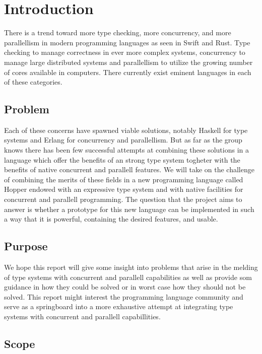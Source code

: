 \chapter{Introduction}

There is a trend toward more type checking, more concurrency, and more parallellism in modern programming languages as seen in Swift\cite{swift} and Rust\cite{rust}. Type checking to manage correctness in ever more complex systems, concurrency to manage large distributed systems and parallellism to utilize the growing number of cores available in computers. There currently exist eminent languages in each of these categories.

\section{Problem}

Each of these concerns have spawned viable solutions, notably Haskell\cite{haskell} for type systems and Erlang\cite{erlang} for concurrency and parallellism. But as far as the group knows there has been few successful attempts at combining these solutions in a language which offer the benefits of an strong type system togheter with the benefits of native concurrent and parallell features. We will take on the challenge of combining the merits of these fields in a new programming language called Hopper endowed with an expressive type system and with native facilities for concurrent and parallell programming. The question that the project aims to answer is whether a prototype for this new language can be implemented in such a way that it is powerful, containing the desired features, and usable.

\section{Purpose}

We hope this report will give some insight into problems that arise in the melding of type systems with concurrent and parallell capabilities as well as provide som guidance in how they could be solved or in worst case how they should not be solved. This report might interest the programming language community and serve as a springboard into a more exhaustive attempt at integrating type systems with concurrent and parallell capabillities.

\section{Scope}

